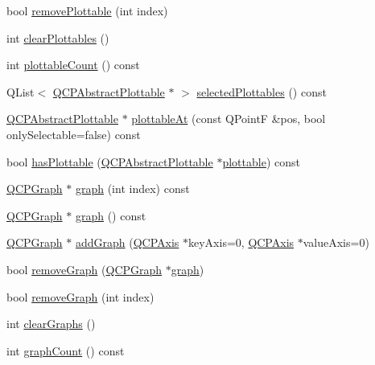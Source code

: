 \begin{DoxyCompactItemize}
\item 
bool \hyperlink{class_q_custom_plot_afc210e0021480f8119bccf37839dbcc8}{remove\+Plottable} (int index)
\item 
int \hyperlink{class_q_custom_plot_a9a409bb3201878adb7ffba1c89c4e004}{clear\+Plottables} ()
\item 
int \hyperlink{class_q_custom_plot_a5f4f15991c14bf9ad659bb2a19dfbed4}{plottable\+Count} () const
\item 
Q\+List$<$ \hyperlink{class_q_c_p_abstract_plottable}{Q\+C\+P\+Abstract\+Plottable} $\ast$ $>$ \hyperlink{class_q_custom_plot_a747faaab57c56891e901a1e97fa4359a}{selected\+Plottables} () const
\item 
\hyperlink{class_q_c_p_abstract_plottable}{Q\+C\+P\+Abstract\+Plottable} $\ast$ \hyperlink{class_q_custom_plot_acddbbd8b16dd633f0d94e5a736fbd8cf}{plottable\+At} (const Q\+PointF \&pos, bool only\+Selectable=false) const
\item 
bool \hyperlink{class_q_custom_plot_a72cefbfbb9e699940e37be605bd9c51e}{has\+Plottable} (\hyperlink{class_q_c_p_abstract_plottable}{Q\+C\+P\+Abstract\+Plottable} $\ast$\hyperlink{class_q_custom_plot_a32de81ff53e263e785b83b52ecd99d6f}{plottable}) const
\item 
\hyperlink{class_q_c_p_graph}{Q\+C\+P\+Graph} $\ast$ \hyperlink{class_q_custom_plot_a6ecae130f684b25276fb47bd3a5875c6}{graph} (int index) const
\item 
\hyperlink{class_q_c_p_graph}{Q\+C\+P\+Graph} $\ast$ \hyperlink{class_q_custom_plot_aac190865a67f19af3fdf2136774997af}{graph} () const
\item 
\hyperlink{class_q_c_p_graph}{Q\+C\+P\+Graph} $\ast$ \hyperlink{class_q_custom_plot_a6fb2873d35a8a8089842d81a70a54167}{add\+Graph} (\hyperlink{class_q_c_p_axis}{Q\+C\+P\+Axis} $\ast$key\+Axis=0, \hyperlink{class_q_c_p_axis}{Q\+C\+P\+Axis} $\ast$value\+Axis=0)
\item 
bool \hyperlink{class_q_custom_plot_a903561be895fb6528a770d66ac5e6713}{remove\+Graph} (\hyperlink{class_q_c_p_graph}{Q\+C\+P\+Graph} $\ast$\hyperlink{class_q_custom_plot_a6ecae130f684b25276fb47bd3a5875c6}{graph})
\item 
bool \hyperlink{class_q_custom_plot_a9554b3d2d5b10c0f884bd4010b6c192c}{remove\+Graph} (int index)
\item 
int \hyperlink{class_q_custom_plot_ab0f3abff2d2f7df3668b5836f39207fa}{clear\+Graphs} ()
\item 
int \hyperlink{class_q_custom_plot_a5e1787cdde868c4d3790f9ebc8207d90}{graph\+Count} () const
\item 

\end{DoxyCompactItemize}
